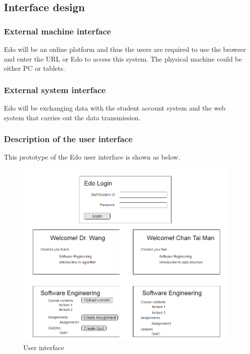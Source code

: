 \documentclass[paper=a4, fontsize=11pt]{scrartcl}
\numberwithin{equation}{section}		%
\numberwithin{figure}{section}			%
\numberwithin{table}{section}				%
\begin{document}
\subsection{Interface design}	


\subsubsection{External machine interface}
Edo will be an online platform and thus the users are required to use the browser and enter the URL or Edo to access this system. The physical machine could be either PC or tablets.

\subsubsection{External system interface}
Edo will be exchanging data with the student account system and the web system that carries out the data transmission. 

\subsubsection{Description of the user interface}
This prototype of the Edo user interface is shown as below.
\begin{figure}[!ht]
	\begin{center}
		\includegraphics[width=\textwidth,height=\textheight,keepaspectratio]{interface}
	\end{center}
	\caption{User interface}
\end{figure}
\end{document}
